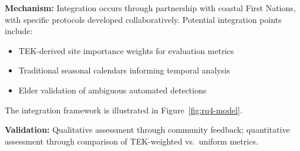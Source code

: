 \documentclass[12pt,oneside]{book}
\begin{document}
\textbf{Mechanism:} Integration occurs through partnership with coastal First Nations, with specific protocols developed collaboratively. Potential integration points include:
\begin{itemize}
    \item TEK-derived site importance weights for evaluation metrics
    \item Traditional seasonal calendars informing temporal analysis
    \item Elder validation of ambiguous automated detections
\end{itemize}
The integration framework is illustrated in Figure~\ref{fig:rq4-model}.

\textbf{Validation:} Qualitative assessment through community feedback; quantitative assessment through comparison of TEK-weighted vs.\ uniform metrics.
\end{document}
